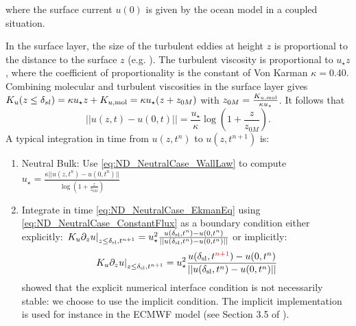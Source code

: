 where the surface current $u(0)$ is given by the ocean model
in a coupled situation.
%
\par
In the surface layer, the size of the turbulent eddies at height $z$
is proportional to the distance to the surface $z$
(e.g. \cite{kawai_wall-modeling_2012}). The turbulent viscosity
is proportional to $u_\star z$, where the coefficient of
proportionality is the constant of Von Karman $\kappa = 0.40$.
Combining molecular and turbulent viscosities in the surface layer
gives $K_u(z\leq \delta_{sl}) = \kappa u_\star z + K_{u, {\rm mol}}
= \kappa u_\star (z + z_{0M})$ with $z_{0M} = \frac{K_{u, {\rm mol}}}{\kappa u_\star}$.
It follows that
\begin{equation}
\label{eq:ND_NeutralCase_WallLaw}
	||u(z, t) - u(0, t)|| = \frac{{u_\star}}{\kappa}
	\log(1+\frac{z}{z_{0M}}).
\end{equation}
A typical integration in time from $u(z, t^{n})$ to
$u(z, t^{n+1})$ is:
\begin{enumerate}
	\item Neutral Bulk: Use \eqref{eq:ND_NeutralCase_WallLaw}
	  to compute $u_\star = \frac{\kappa ||u(z, t^n)-u(0, t^n)||}
			{\log(1+\frac{z}{z_{0M}})}$
  \item Integrate in time \eqref{eq:ND_NeutralCase_EkmanEq}
  using \eqref{eq:ND_NeutralCase_ConstantFlux} as a boundary condition
		either explicitly: $\left.K_u \partial_z u
		\right|_{z\leq \delta_{\rm sl}, t^{n+1}}
		= u_\star^2 \frac{u(\delta_{\rm sl}, t^n)-u(0,t^n)}
		{||u(\delta_{\rm sl}, t^n)-u(0,t^n)||}$
		or implicitly:
	\begin{equation}
		\left.K_u \partial_z u
		\right|_{z\leq \delta_{\rm sl}, t^{n+1}}
		= u_\star^2 \frac{u(\delta_{\rm sl},
		t^{\color{red} n+1})-u(0,t^n)}
		{||u(\delta_{\rm sl}, t^n)-u(0,t^n)||}
	\end{equation}
	\cite{lemarie_stability_2015} showed that the explicit
	numerical interface condition is not necessarily
	stable: we choose to use the implicit condition.
	The implicit implementation is used for instance in the
	ECMWF model (see Section 3.5 of \citep{ecmwf_ifs_2020}).
\end{enumerate}

